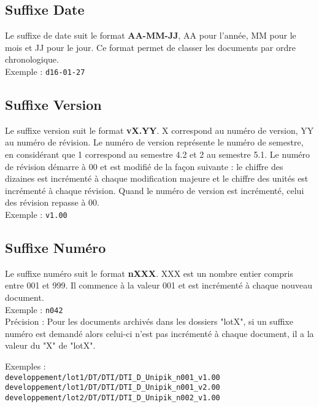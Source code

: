 \subsection{Suffixe Date}
\label{suffixe_date}

Le suffixe de date suit le format \textbf{AA-MM-JJ}, AA pour l'année, MM pour le mois et JJ pour le jour. Ce format permet de classer les documents par ordre chronologique.\\

Exemple : \verb+d16-01-27+

\subsection{Suffixe Version}
\label{suffixe_version}

Le suffixe version suit le format \textbf{vX.YY}. X correspond au numéro de version, YY au numéro de révision. Le numéro de version représente le numéro de semestre, en considérant que 1 correspond au semestre 4.2 et 2 au semestre 5.1. Le numéro de révision démarre à 00 et est modifié de la façon suivante : le chiffre des dizaines est incrémenté à chaque modification majeure et le chiffre des unités est incrémenté à chaque révision. Quand le numéro de version est incrémenté, celui des révision repasse à 00.\\

Exemple : \verb+v1.00+

\subsection{Suffixe Numéro}
\label{suffixe_numero}

Le suffixe numéro suit le format \textbf{nXXX}. XXX est un nombre entier compris entre 001 et 999. Il commence à la valeur 001 et est incrémenté à chaque nouveau document.\\

Exemple : \verb+n042+\\

Précision : Pour les documents archivés dans les dossiers "lotX", si un suffixe numéro est demandé alors celui-ci n'est pas incrémenté à chaque document, il a la valeur du "X" de "lotX".

Exemples :\\ 
\verb+developpement/lot1/DT/DTI/DTI_D_Unipik_n001_v1.00+\\
\verb+developpement/lot1/DT/DTI/DTI_D_Unipik_n001_v2.00+\\
\verb+developpement/lot2/DT/DTI/DTI_D_Unipik_n002_v1.00+

